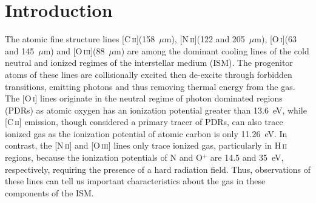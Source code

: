 \documentclass[preprint2]{aastex}
\begin{document}




\section{Introduction}
The atomic fine structure lines [C\,\textsc{ii}](158~$\mu$m), [N\,\textsc{ii}](122 and 205~$\mu$m), [O\,\textsc{i}](63 and 145~$\mu$m) and [O\,\textsc{iii}](88~$\mu$m) are among the dominant cooling lines of the cold neutral and ionized regimes of the interstellar medium (ISM).  The progenitor atoms of these lines are collisionally excited then de-excite through forbidden transitions, emitting photons and thus removing thermal energy from the gas.  The [O\,\textsc{i}] lines originate in the neutral regime of photon dominated regions (PDRs) \citep{1985ApJ...291..722T} as atomic oxygen has an ionization potential greater than 13.6~eV, while [C\,\textsc{ii}] emission, though considered a primary tracer of PDRs, can also trace ionized gas as the ionization potential of atomic carbon is only 11.26~eV.  In contrast, the [N\,\textsc{ii}] and [O\,\textsc{iii}] lines only trace ionized gas, particularly in H\,\textsc{ii} regions, because the ionization potentials of N and O$^{+}$ are 14.5 and 35~eV, respectively, requiring the presence of a hard radiation field.  Thus, observations of these lines can tell us important characteristics about the gas in these components of the ISM.  
\end{document}
